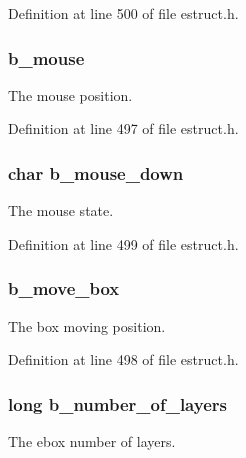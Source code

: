 Definition at line 500 of file estruct.\-h.

\hypertarget{struct__edspbox_a8831d355ec1dbb2dca9a68268a977965}{
\subsubsection[{b\-\_\-mouse}]{ b\-\_\-mouse}}\label{struct__edspbox_a8831d355ec1dbb2dca9a68268a977965}
The mouse position. 

Definition at line 497 of file estruct.\-h.

\hypertarget{struct__edspbox_a1dc439a4d35e98f78370c81ceadc8ea0}{
\subsubsection[{b\-\_\-mouse\-\_\-down}]{\setlength{\rightskip}{0pt plus 5cm}char b\-\_\-mouse\-\_\-down}}\label{struct__edspbox_a1dc439a4d35e98f78370c81ceadc8ea0}
The mouse state. 

Definition at line 499 of file estruct.\-h.

\hypertarget{struct__edspbox_a2b028829ae54f8ccede6bb0d5903f7fd}{
\subsubsection[{b\-\_\-move\-\_\-box}]{ b\-\_\-move\-\_\-box}}\label{struct__edspbox_a2b028829ae54f8ccede6bb0d5903f7fd}
The box moving position. 

Definition at line 498 of file estruct.\-h.

\hypertarget{struct__edspbox_a84105957ca11a224cf734f350fb23ac9}{
\subsubsection[{b\-\_\-number\-\_\-of\-\_\-layers}]{\setlength{\rightskip}{0pt plus 5cm}long b\-\_\-number\-\_\-of\-\_\-layers}}\label{struct__edspbox_a84105957ca11a224cf734f350fb23ac9}
The ebox number of layers. 

